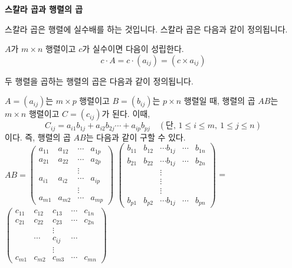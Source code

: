 \newpage
\begin{flushleft}
    {\textcolor{subheader}{{\LARGE\textbf{스칼라 곱과 행렬의 곱}}}}
\end{flushleft}

\begin{flushleft}
    스칼라 곱은 행렬에 실수배를 하는 것입니다. 스칼라 곱은 다음과 같이 정의됩니다.
\end{flushleft}

\begin{tcolorbox}[colback = white, colframe = Definition, title = \textmd{정의: 스칼라 곱}]
    $A$가 $m \times n$ 행렬이고 $c$가 실수이면 다음이 성립한다.
    $$ c \cdot A = c \cdot (a_{ij}) = (c \times a_{ij}) $$  
\end{tcolorbox}

\begin{flushleft}
    두 행렬을 곱하는 행렬의 곱은 다음과 같이 정의됩니다.
\end{flushleft}

\begin{tcolorbox}[colback = white, colframe = Definition, title = \textmd{정의: 행렬의 곱}]
    $A = (a_{ij})$는 $m \times p $ 행렬이고 $B = (b_{ij})$는 $p \times n$ 행렬일 때, 행렬의 곱 $AB$는 $m \times n $ 행렬이고 $C = (c_{ij})$가 된다. 이때, 
    \[ C_{ij} = a_{i1}b_{1j} + a_{i2}b_{2j} \cdots + a_{ip}b_{pj} \quad (\text{단, } 1 \leq i \leq m, \ 1 \leq j \leq n) \]
    이다. 즉, 행렬의 곱 $AB$는 다음과 같이 구할 수 있다. \\

    $ AB = \begin{pmatrix} a_{11} & a_{12} & \cdots & a_{1p} \\  
    a_{21} & a_{22} & \cdots  & a_{2p}  \\ && \vdots  \\ 
    a_{i1} & a_{i2} & \cdots & a_{ip}
    \\  && \vdots   \\ 
    a_{m1} & a_{m2} & \cdots & a_{mp}\end{pmatrix} $
    $ \begin{pmatrix} b_{11} & b_{12} &  \cdots b_{1j} & \cdots & b_{1n} \\  
    b_{21} & b_{22} & \cdots b_{1j} & \cdots & b_{2n}  \\ && \vdots &&  \\ && \vdots &&  \\ && \vdots &&  \\
    b_{p1} & b_{p2} & \cdots b_{1j} & \cdots & b_{pn}\end{pmatrix} $
    =
    $ \begin{pmatrix} c_{11} & c_{12} & c_{13} & \cdots & c_{1n} \\  
    c_{21} & c_{22} & c_{23} & \cdots  & c_{2n}  \\ && \vdots &&  \\ 
    & \cdots & c_{ij} & \cdots 
    \\ && \vdots &&  \\ 
    c_{m1} & c_{m2} & c_{m3} & \cdots & c_{mn}\end{pmatrix} $
\end{tcolorbox}

